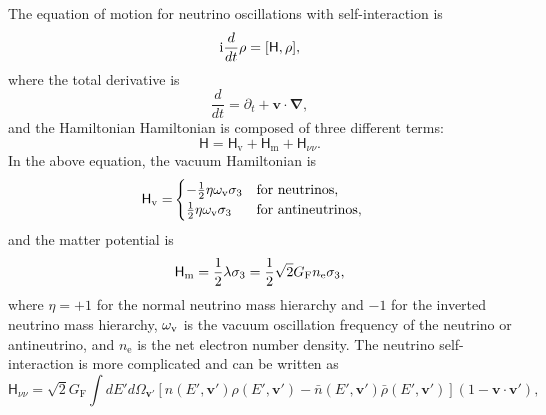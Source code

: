 The equation of motion for neutrino oscillations with self-interaction is\cite{Sigl1993}
\begin{equation}
   \ri \frac{d}{dt}\rho = [ \mathsf H,\rho],
   \label{chap:collective-sec:collective-eqn:equation-of-motion-general}
\end{equation}
where the total derivative is
\begin{equation}
   \frac{d}{dt} = \partial_t + \mathbf v\cdot \boldsymbol{\nabla},
\end{equation}
and the Hamiltonian Hamiltonian is composed of three different terms:
\begin{equation}
   \mathsf H = \mathsf H_{\mathrm v} + \mathsf H_{\mathrm m} +\mathsf  H_{\nu\nu}.
\end{equation}
In the above equation, the vacuum Hamiltonian is
\begin{align*}
    \mathsf H_\mathrm v =& \begin{cases}
    -\frac{1}{2}\eta \omega_\mathrm v \sigma_3 & \text{for neutrinos},\\
    \frac{1}{2}\eta \omega_\mathrm v \sigma_3 & \text{for antineutrinos},
    \end{cases}
\end{align*}
and the matter potential is
\begin{equation}
    \mathsf H_\mathrm m = \frac{1}{2} \lambda \sigma_3  = \frac{1}{2} \sqrt{2}G_{\mathrm F} n_{\mathrm e} \sigma_3,
\end{equation}
where $\eta = +1$ for the normal neutrino mass hierarchy and $-1$ for the inverted neutrino mass hierarchy, $\omega_\mathrm v$ is the vacuum oscillation frequency of the neutrino or antineutrino, and $n_{\mathrm e}$ is the net electron number density. The neutrino self-interaction is more complicated and can be written as
\begin{equation}
    \mathsf H_{\nu\nu} = \sqrt{2}G_{\mathrm F} \int dE' d\Omega_{\mathbf v'} \left[ n(E',\mathbf v')\rho(E',\mathbf v') - \bar n(E',\mathbf v')\bar\rho(E',\mathbf v') \right] (1-\mathbf v \cdot \mathbf v'),
    \label{chap:collective-sec:collective-eqn:equation-of-motion-self-interaction}
\end{equation}
